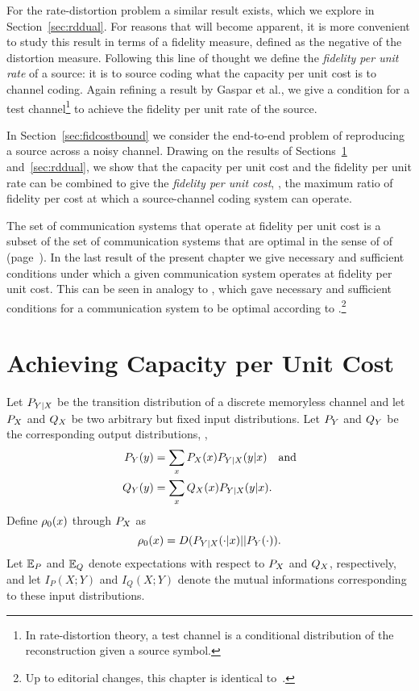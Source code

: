 For the rate-distortion problem a similar result exists, which we explore in
Section~\ref{sec:rddual}. For reasons that will become apparent, it is more
convenient to study this result in terms of a fidelity measure, defined as the
negative of the distortion measure. Following this line of
thought we define the \emph{fidelity per unit rate} of a source:
it is to source coding what the capacity per unit cost is to channel coding.
Again refining a result by Gaspar et al., we give a condition for a test
channel\footnote{In rate-distortion theory, a test channel is a conditional
distribution of the reconstruction given a source symbol.}
to achieve the fidelity per unit rate of the source. 

In Section~\ref{sec:fidcostbound} we consider the end-to-end problem of
reproducing a source across a noisy channel. Drawing on the results of
Sections~\ref{sec:cuc} and~\ref{sec:rddual}, we show that the capacity per unit
cost and the fidelity per unit rate can be combined to give the \emph{fidelity
per unit cost}, \ie, the maximum ratio of fidelity per cost at which a
source-channel coding system can operate.

The set of communication systems that operate at fidelity per unit cost is a
subset of the set of communication systems that are optimal in the sense of
 of  (page~\pageref{def:optimality}).
In the last result of the present chapter we give necessary and sufficient
conditions under which a given communication  system operates at fidelity per
unit cost. This can be seen in analogy to , which
gave necessary and sufficient conditions for a communication system to be
optimal according to .\footnote{Up to editorial changes, this
chapter is identical to~\cite{KleinerR2009a}.}


\section{Achieving Capacity per Unit Cost}
\label{sec:cuc}

Let $P_{Y|X}$ be the transition distribution of a discrete memoryless channel and
let $P_X$ and $Q_X$ be two arbitrary but fixed input distributions. Let $P_Y$
and $Q_Y$ be the corresponding output distributions, \ie, 
\begin{align*}
  P_Y(y) &= \sum_x P_X(x) P_{Y|X}(y|x) \quad\text{and} \\
  Q_Y(y) &= \sum_x Q_X(x) P_{Y|X}(y|x).
\end{align*}
Define ${\rho_0}(x)$ through $P_X$ as
\begin{equation}
  \label{eq:optrho}
  {\rho_0}(x) = D(P_{Y|X}(\cdot|x)||P_Y(\cdot)).
\end{equation}
Let $\mathbb{E}_P$ and $\mathbb{E}_Q$ denote expectations with respect to $P_X$ and $Q_X$,
respectively, and let $I_P(X;Y)$ and $I_Q(X;Y)$ denote the mutual informations
corresponding to these input distributions. 

